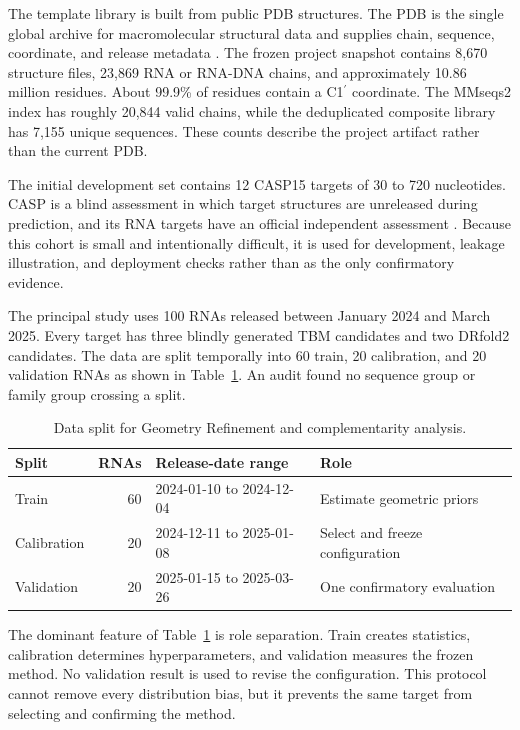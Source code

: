 \documentclass[12pt,a4paper,oneside]{report}
\newcommand{\cprime}{C1$^{\prime}$}
\begin{document}
The template library is built from public PDB structures. The PDB is the single global
archive for macromolecular structural data and supplies chain, sequence, coordinate, and
release metadata \cite{pdb_archive}. The frozen project snapshot contains 8,670
structure files, 23,869 RNA or RNA-DNA chains, and approximately 10.86 million residues.
About 99.9\% of residues contain a \cprime{} coordinate. The MMseqs2 index has roughly
20,844 valid chains, while the deduplicated composite library has 7,155 unique sequences.
These counts describe the project artifact rather than the current PDB.

The initial development set contains 12 CASP15 targets of 30 to 720 nucleotides. CASP is
a blind assessment in which target structures are unreleased during prediction, and its
RNA targets have an official independent assessment \cite{casp15}. Because this cohort
is small and intentionally difficult, it is used for development, leakage illustration,
and deployment checks rather than as the only confirmatory evidence.

The principal study uses 100 RNAs released between January 2024 and March 2025. Every
target has three blindly generated TBM candidates and two DRfold2 candidates. The data
are split temporally into 60 train, 20 calibration, and 20 validation RNAs as shown in
Table~\ref{tab:splits_en}. An audit found no sequence group or family group crossing a
split.

\begin{table}[H]
\centering
\caption{Data split for Geometry Refinement and complementarity analysis.}
\label{tab:splits_en}
\begin{tabularx}{\textwidth}{l r p{4.2cm} X}
\toprule
Split & RNAs & Release-date range & Role \\
\midrule
Train & 60 & 2024-01-10 to 2024-12-04 & Estimate geometric priors \\
Calibration & 20 & 2024-12-11 to 2025-01-08 & Select and freeze configuration \\
Validation & 20 & 2025-01-15 to 2025-03-26 & One confirmatory evaluation \\
\bottomrule
\end{tabularx}
\end{table}

The dominant feature of Table~\ref{tab:splits_en} is role separation. Train creates
statistics, calibration determines hyperparameters, and validation measures the frozen
method. No validation result is used to revise the configuration. This protocol cannot
remove every distribution bias, but it prevents the same target from selecting and
confirming the method.
\end{document}
